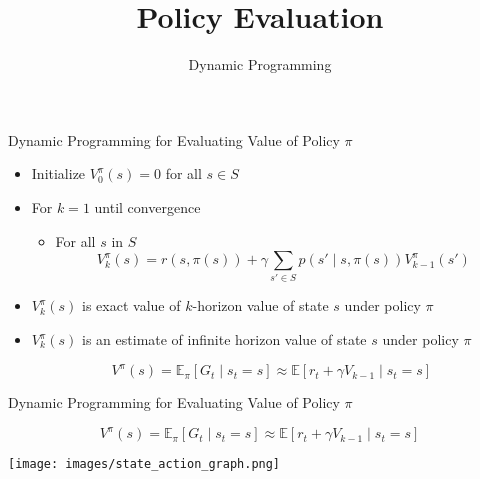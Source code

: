 \documentclass[aspectratio=169]{../latex_main/tntbeamer}  %
\title[Reinforcement Learning: Policy Evaluation]{Policy Evaluation}
\subtitle{Dynamic Programming}
\begin{document}
	
	\maketitle

\begin{frame}[c]{Dynamic Programming for Evaluating Value of Policy $\pi$}

\begin{itemize}
	\item Initialize $V^\pi_0(s) = 0$ for all $s\in S$
	\item For $k=1$ until convergence
	\begin{itemize}
		\item For all $s$ in $S$
		$$V^\pi_k (s)  = r(s, \pi(s)) + \gamma \sum_{s' \in S} p(s' \mid s, \pi(s)) V^\pi_{k-1} (s') $$
	\end{itemize}
	\item $V^\pi_k (s)$ is exact value of $k$-horizon value of state $s$ under policy $\pi$
	\item $V^\pi_k (s)$ is an estimate of infinite horizon value of state $s$ under policy $\pi$
	
	$$V^\pi (s) = \mathbb{E}_\pi [G_t \mid s_t = s] \approx \mathbb{E} [r_t + \gamma V_{k-1} \mid s_t = s]$$
\end{itemize}



\end{frame}
\begin{frame}[c]{Dynamic Programming for Evaluating Value of Policy $\pi$}

$$V^\pi (s) = \mathbb{E}_\pi [G_t \mid s_t = s] \approx \mathbb{E} [r_t + \gamma V_{k-1} \mid s_t = s]$$

\begin{center}
	\texttt{[image: images/state\_action\_graph.png]}
\end{center}



\end{frame}
\end{document}
